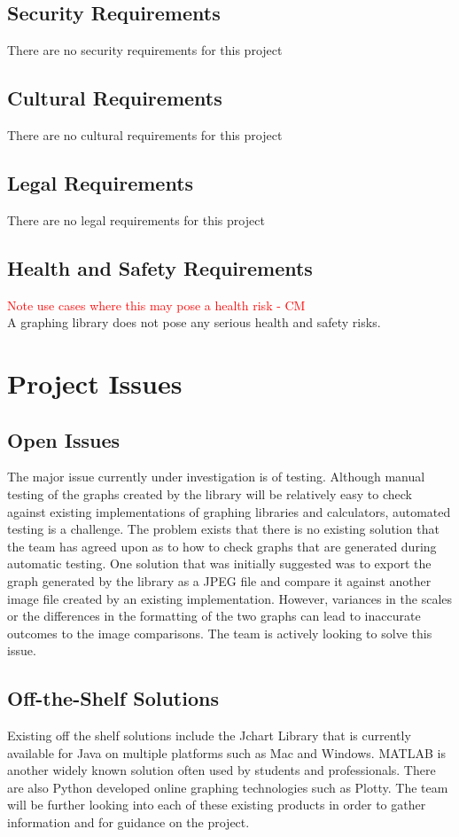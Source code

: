 \documentclass[12pt, titlepage]{article}
\begin{document}
\subsection{Security Requirements}
There are no security requirements for this project
\subsection{Cultural Requirements}
There are no cultural requirements for this project
\subsection{Legal Requirements}
There are no legal requirements for this project
\subsection{Health and Safety Requirements} %
\textcolor{red}{Note use cases where this may pose a health risk - CM} \\
A graphing library does not pose any serious health and safety risks.

\clearpage
\section{Project Issues}

\subsection{Open Issues}
The major issue currently under investigation is of testing. Although manual testing of the graphs created by the library will be relatively easy to check against existing implementations of graphing libraries and calculators, automated testing is a challenge. The problem exists that there is no existing solution that the team has agreed upon as to how to check graphs that are generated during automatic testing. One solution that was initially suggested was to export the graph generated by the library as a JPEG file and compare it against another image file created by an existing implementation. However, variances in the scales or the differences in the formatting of the two graphs can lead to inaccurate outcomes to the image comparisons. The team is actively looking to solve this issue. 
\subsection{Off-the-Shelf Solutions}
Existing off the shelf solutions include the Jchart Library that is currently available for Java on multiple platforms such as Mac and Windows. MATLAB is another widely known solution often used by students and professionals. There are also Python developed online graphing technologies such as Plotty. The team will be further looking into each of these existing products in order to gather information and for guidance on the project. 
\end{document}
